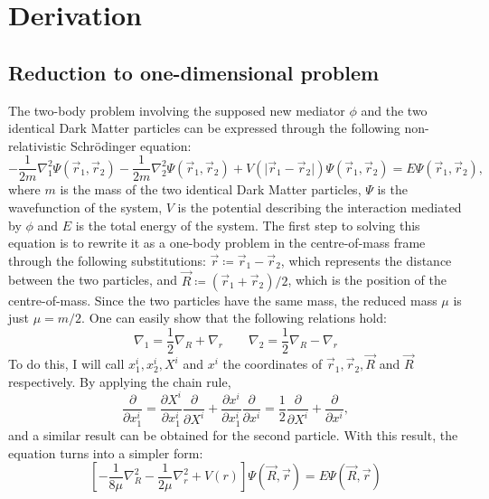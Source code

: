 \section*{Derivation}

\subsection*{Reduction to one-dimensional problem}

The two-body problem involving the supposed new mediator \(\phi \) and the two identical Dark Matter particles can be expressed through the following non-relativistic Schrödinger equation:
\begin{equation}
	-\frac{1}{2m} \nabla_1 ^2 \Psi(\vec{r}_1,\vec{r}_2)  - \frac{1}{2m} \nabla_2 ^2 \Psi(\vec{r}_1,\vec{r}_2)  + V(\vert \vec{r}_1 - \vec{r}_2 \vert ) \Psi(\vec{r}_1,\vec{r}_2) =E \Psi (\vec{r}_1,\vec{r}_2),
\end{equation}
where \(m\) is the mass of the two identical Dark Matter particles, \(\Psi\) is the wavefunction of the system, \(V\) is the potential describing the interaction mediated by \(\phi \) and \(E\) is the total energy of the system. The first step to solving this equation is to rewrite it as a one-body problem in the centre-of-mass frame through the following substitutions: \(\vec{r} \coloneqq  \vec{r}_1 - \vec{r}_2\), which represents the distance between the two particles, and \(\vec{R} \coloneqq (\vec{r}_1 + \vec{r}_2) / 2\), which is the position of the centre-of-mass. Since the two particles have the same mass, the reduced mass \(\mu \) is just \(\mu = m / 2\). One can easily show that the following relations hold:
\begin{equation}
	\nabla _1 = \frac{1}{2} \nabla _R + \nabla _r
	\qquad
	\nabla _2 = \frac{1}{2} \nabla _R - \nabla _r
\end{equation}
To do this, I will call \(x^i_1, x^i_2, X^i \) and \(x^i\) the coordinates of \(\vec{r}_1, \vec{r}_2, \vec{R} \) and \(\vec{R}\) respectively. By applying the chain rule,
\begin{equation}
	\frac{\partial }{\partial x^i_1} = \frac{\partial X^i}{\partial x^i_1} \frac{\partial }{\partial X^i} + \frac{\partial x^i}{\partial x^i_1} \frac{\partial }{\partial x^i} = \frac{1}{2} \frac{\partial }{\partial X^i} + \frac{\partial }{\partial x^i},
\end{equation}
and a similar result can be obtained for the second particle. With this result, the equation turns into a simpler form:
\begin{equation}
	\left[- \frac{1}{8\mu} \nabla _R^{2} - \frac{1}{2\mu } \nabla _r^2 + V(r)\right] \Psi (\vec{R},\vec{r})= E \Psi (\vec{R},\vec{r})
\end{equation}
